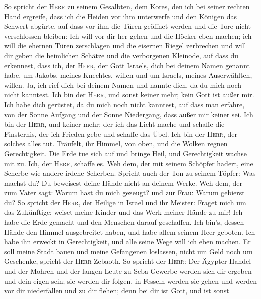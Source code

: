  So spricht der \textsc{Herr} zu seinem Gesalbten, dem
Kores, den ich bei seiner rechten Hand ergreife, dass ich die Heiden vor
ihm unterwerfe und den Königen das Schwert abgürte, auf dass vor ihm die
Türen geöffnet werden und die Tore nicht verschlossen bleiben:
 Ich will vor dir her gehen und die Höcker eben machen;
ich will die ehernen Türen zerschlagen und die eisernen Riegel
zerbrechen  und will dir geben die heimlichen Schätze und
die verborgenen Kleinode, auf dass du erkennest, dass ich, der
\textsc{Herr}, der Gott Israels, dich bei deinem Namen genannt habe,
 um Jakobs, meines Knechtes, willen und um Israels, meines
Auserwählten, willen. Ja, ich rief dich bei deinem Namen und nannte
dich, da du mich noch nicht kanntest.  Ich bin der
\textsc{Herr}, und sonst keiner mehr; kein Gott ist außer mir. Ich habe
dich gerüstet, da du mich noch nicht kanntest,  auf dass
man erfahre, von der Sonne Aufgang und der Sonne Niedergang, dass außer
mir keiner sei. Ich bin der \textsc{Herr}, und keiner mehr;
 der ich das Licht mache und schaffe die Finsternis, der
ich Frieden gebe und schaffe das Übel. Ich bin der \textsc{Herr}, der
solches alles tut.  Träufelt, ihr Himmel, von oben, und
die Wolken regnen Gerechtigkeit. Die Erde tue sich auf und bringe Heil,
und Gerechtigkeit wachse mit zu. Ich, der \textsc{Herr}, schaffe es.
 Weh dem, der mit seinem Schöpfer hadert, eine Scherbe wie
andere irdene Scherben. Spricht auch der Ton zu seinem Töpfer: Was
machst du? Du beweisest deine Hände nicht an deinem Werke.
 Weh dem, der zum Vater sagt: Warum hast du mich gezeugt?
und zur Frau: Warum gebierst du?  So spricht der
\textsc{Herr}, der Heilige in Israel und ihr Meister: Fraget mich um das
Zukünftige; weiset meine Kinder und das Werk meiner Hände zu mir!
 Ich habe die Erde gemacht und den Menschen darauf
geschaffen. Ich bin's, dessen Hände den Himmel ausgebreitet haben, und
habe allem seinem Heer geboten.  Ich habe ihn erweckt in
Gerechtigkeit, und alle seine Wege will ich eben machen. Er soll meine
Stadt bauen und meine Gefangenen loslassen, nicht um Geld noch um
Geschenke, spricht der \textsc{Herr} Zebaoth.  So spricht
der \textsc{Herr}: Der Ägypter Handel und der Mohren und der langen
Leute zu Seba Gewerbe werden sich dir ergeben und dein eigen sein; sie
werden dir folgen, in Fesseln werden sie gehen und werden vor dir
niederfallen und zu dir flehen; denn bei dir ist Gott, und ist sonst
